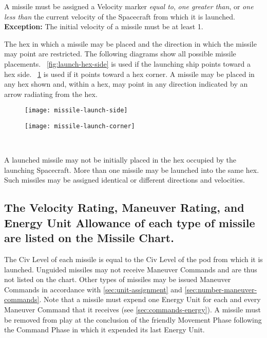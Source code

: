 A missile must be assigned a Velocity marker \emph{equal to},
\emph{one greater than}, or \emph{one less than} the current velocity
of the Spacecraft from which it is launched. \textbf{Exception:} The
initial velocity of a missile must be at least 1.

The hex in which a missile may be placed and the direction in which
the missile may point are restricted. The following diagrams show all
possible missile placements. \figurename\ \ref{fig:launch-hex-side} is
used if the launching ship points toward a hex side. \figurename\ 
\ref{fig:launch-hex-corner} is used if it points toward a hex corner.
A missile may be placed in any hex shown and, within a hex, may point
in any direction indicated by an arrow radiating from the hex.

\begin{figure}[htbp]
  \begin{minipage}[t]{0.45\textwidth}
    \centering
    \caption[Missile launch from hex side]{~}
    \label{fig:launch-hex-side}
    \texttt{[image: missile-launch-side]}
  \end{minipage}
  \begin{minipage}[t]{0.45\textwidth}
    \centering
    \caption[Missile launch from hex corner]{~}
    \label{fig:launch-hex-corner}
    \texttt{[image: missile-launch-corner]}
  \end{minipage}
\end{figure}


A launched missile may not be initially placed in the hex occupied by
the launching Spacecraft. More than one missile may be launched into
the same hex. Such missiles may be assigned identical or different
directions and velocities.


\subsection[Missile Chart]{The Velocity Rating, Maneuver Rating, and
  Energy Unit 
  Allowance of each type of missile are listed on the  
  Missile Chart.}
\label{sec:missile-chart}



The Civ Level of each missile is equal to the Civ Level of the pod
from which it is launched. Unguided missiles may not receive Maneuver
Commands and are thus not listed on the chart. Other types of missiles
may be issued Maneuver Commands in accordance with
\ref{sec:unit-assignment} and \ref{sec:number-maneuver-commands}. Note
that a missile must expend one Energy Unit for each and every Maneuver
Command that it receives (see \ref{sec:commands-energy}). A missile
must be removed from play at the conclusion of the friendly Movement
Phase following the Command Phase in which it expended its last Energy
Unit.


